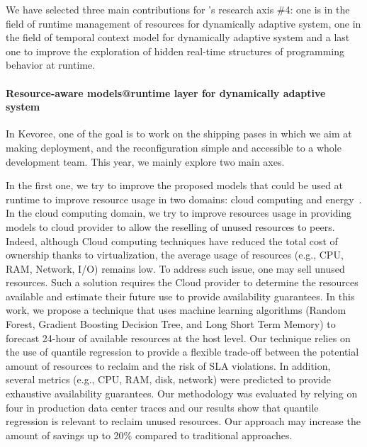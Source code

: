 We have selected three main contributions for \team's research axis \#4:
one is in the field of runtime management of resources for dynamically adaptive system, one in the field of temporal context model for dynamically adaptive system and a last one 
to improve the exploration of hidden real-time structures of programming behavior at runtime. 


\paragraph{Resource-aware models@runtime layer for dynamically adaptive system}

In Kevoree, one of the goal is to work on the shipping pases in which we aim at making deployment, and the reconfiguration simple and accessible to a whole development team. This year, we mainly explore two main axes.

In the first one, we try to improve the proposed models that could be used at runtime to improve resource usage in two domains: cloud computing and energy~\cite{dartois:hal-01898438}. In the cloud computing domain, we try to improve resources usage in providing models to cloud provider to allow the reselling of unused resources to peers. Indeed, although Cloud computing techniques have reduced the total cost of ownership thanks to virtualization, the average usage of resources (e.g., CPU, RAM, Network, I/O) remains low. To address such issue, one may sell unused resources. Such a solution requires the Cloud provider to determine the resources available and estimate their future use to provide availability guarantees. In this work,  we propose a technique that uses machine learning algorithms (Random Forest, Gradient Boosting Decision Tree, and Long Short Term Memory) to forecast 24-hour of available resources at the host level. Our technique relies on the use of quantile regression to provide a flexible trade-off between the potential amount of resources to reclaim and the risk of SLA violations. In addition, several metrics (e.g., CPU, RAM, disk, network) were predicted to provide exhaustive availability guarantees. Our methodology was evaluated by relying on four in production data center traces and our results show that quantile regression is relevant to reclaim unused resources. Our approach may increase the amount of savings up to 20\% compared to traditional approaches.\\

